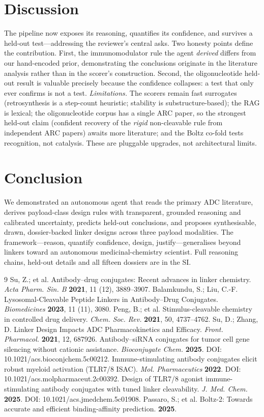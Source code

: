 \documentclass[10pt]{article}
\begin{document}
\section{Discussion}The pipeline now exposes its reasoning, quantifies its confidence, and survives a held-out test---addressing the reviewer's central asks. Two honesty points define the contribution. First, the immunomodulator rule the agent \emph{derived} differs from our hand-encoded prior, demonstrating the conclusions originate in the literature analysis rather than in the scorer's construction. Second, the oligonucleotide held-out result is valuable precisely because the confidence collapses: a test that only ever confirms is not a test. \emph{Limitations.} The scorers remain fast surrogates (retrosynthesis is a step-count heuristic; stability is substructure-based); the RAG is lexical; the oligonucleotide corpus has a single ARC paper, so the strongest held-out claim (confident recovery of the \emph{rigid} non-cleavable rule from independent ARC papers) awaits more literature; and the Boltz co-fold tests recognition, not catalysis. These are pluggable upgrades, not architectural limits.
\section{Conclusion}We demonstrated an autonomous agent that reads the primary ADC literature, derives payload-class design rules with transparent, grounded reasoning and calibrated uncertainty, predicts held-out conclusions, and proposes synthesisable, drawn, dossier-backed linker designs across three payload modalities. The framework---reason, quantify confidence, design, justify---generalises beyond linkers toward an autonomous medicinal-chemistry scientist. Full reasoning chains, held-out details and all fifteen dossiers are in the SI.
\begin{thebibliography}{9}
 Su, Z.; et al. Antibody--drug conjugates: Recent advances in linker chemistry. \emph{Acta Pharm. Sin. B} \textbf{2021}, 11 (12), 3889--3907.
 Balamkundu, S.; Liu, C.-F. Lysosomal-Cleavable Peptide Linkers in Antibody--Drug Conjugates. \emph{Biomedicines} \textbf{2023}, 11 (11), 3080.
 Peng, B.; et al. Stimulus-cleavable chemistry in controlled drug delivery. \emph{Chem. Soc. Rev.} \textbf{2021}, 50, 4737--4762.
 Su, D.; Zhang, D. Linker Design Impacts ADC Pharmacokinetics and Efficacy. \emph{Front. Pharmacol.} \textbf{2021}, 12, 687926.
 Antibody--siRNA conjugates for tumor cell gene silencing without cationic assistance. \emph{Bioconjugate Chem.} \textbf{2025}. DOI: 10.1021/acs.bioconjchem.5c00212.
 Immune-stimulating antibody conjugates elicit robust myeloid activation (TLR7/8 ISAC). \emph{Mol. Pharmaceutics} \textbf{2022}. DOI: 10.1021/acs.molpharmaceut.2c00392.
 Design of TLR7/8 agonist immune-stimulating antibody conjugates with tuned linker cleavability. \emph{J. Med. Chem.} \textbf{2025}. DOI: 10.1021/acs.jmedchem.5c01908.
 Passaro, S.; et al. Boltz-2: Towards accurate and efficient binding-affinity prediction. \textbf{2025}.
\end{thebibliography}
\end{document}

